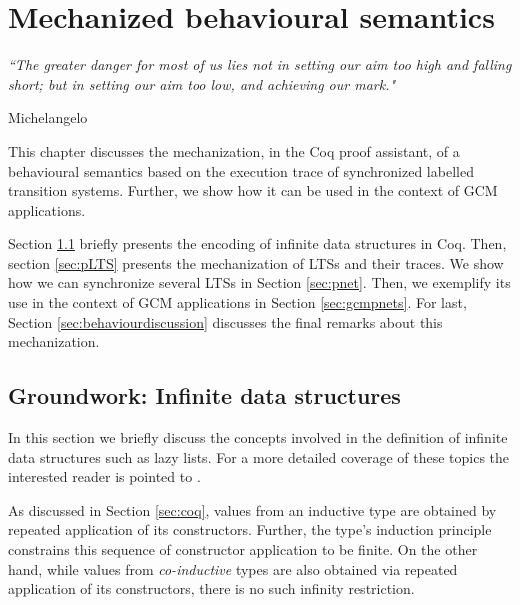 
\chapter{Mechanized behavioural semantics} 
\label{chap:behaviour} 

\epigraph{\textit{“The greater danger for most of us lies not in setting our aim too high and falling short; but in setting our aim too low, and achieving our mark."}}{Michelangelo}



\minitoc




	This chapter discusses the mechanization, in the Coq proof assistant, of a behavioural 
semantics based on the execution trace of synchronized labelled transition systems. Further, we show
how it can be used in the context of \ac{GCM} applications.

	Section \ref{sec:groundwork} briefly presents the encoding of infinite data structures in Coq.	
	Then, section \ref{sec:pLTS} presents the mechanization of \ac{LTS}s and
their traces. We show how we can synchronize several \ac{LTS}s in Section \ref{sec:pnet}.
Then, we exemplify its use in the context of \ac{GCM} applications in Section \ref{sec:gcmpnets}.
For last, Section \ref{sec:behaviourdiscussion} discusses the final remarks about this
mechanization.



\section{Groundwork: Infinite data structures}
\label{sec:groundwork}

	In this section we briefly discuss the concepts involved in the definition of infinite data structures such as lazy lists.	
	For a more detailed coverage of these topics the interested
	reader is pointed to \cite[chap. 13]{opac-b1101046}.


	As discussed in Section \ref{sec:coq}, values from an inductive type are obtained by repeated application of
	its constructors. Further, the type's induction principle constrains this sequence of constructor application
	to be finite. On the other hand, while values from \textit{co-inductive} types are also obtained via repeated 
	application of its constructors, there is no such infinity restriction.

